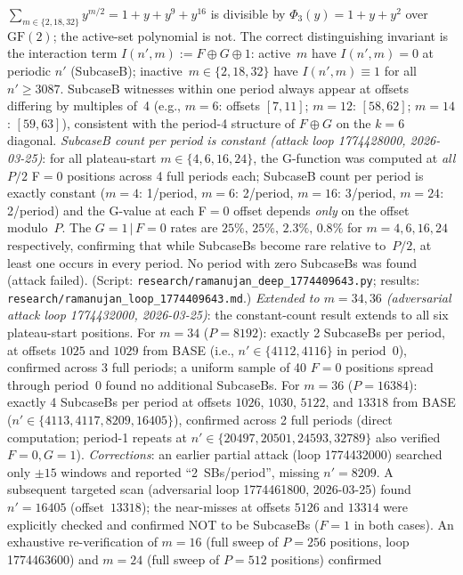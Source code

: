 \documentclass[11pt]{article}
\theoremstyle{plain}
\theoremstyle{definition}
\begin{document}
$\sum_{m\in\{2,18,32\}} y^{m/2} = 1+y+y^9+y^{16}$
is divisible by $\Phi_3(y)=1+y+y^2$ over $\mathrm{GF}(2)$; the active-set
polynomial is not.
The correct distinguishing invariant is the interaction term $I(n',m):=F{\oplus}G{\oplus}1$:
active~$m$ have $I(n',m)=0$ at periodic $n'$ (SubcaseB); inactive~$m\in\{2,18,32\}$ have
$I(n',m)\equiv 1$ for all~$n'\geq 3087$.
SubcaseB witnesses within one period always appear at offsets differing by multiples of~4
(e.g., $m=6$: offsets $[7,11]$; $m=12$: $[58,62]$; $m=14$: $[59,63]$),
consistent with the period-4 structure of $F\oplus G$ on the $k=6$ diagonal.
\emph{SubcaseB count per period is constant (attack loop 1774428000, 2026-03-25)}: for all
plateau-start $m \in \{4,6,16,24\}$, the G-function was computed at \emph{all} $P/2$
F$=0$ positions across 4 full periods each; SubcaseB count per period is
exactly constant ($m=4$: 1/period, $m=6$: 2/period, $m=16$: 3/period, $m=24$: 2/period)
and the G-value at each F$=0$ offset depends \emph{only} on the offset modulo~$P$.
The $G=1\,|\,F{=}0$ rates are $25\%,\,25\%,\,2.3\%,\,0.8\%$ for $m=4,6,16,24$ respectively,
confirming that while SubcaseBs become rare relative to~$P/2$, at least one occurs in
every period.  No period with zero SubcaseBs was found (attack failed).
(Script: \texttt{research/ramanujan\_deep\_1774409643.py};
results: \texttt{research/ramanujan\_loop\_1774409643.md}.)
\emph{Extended to $m=34,36$ (adversarial attack loop 1774432000, 2026-03-25)}: the constant-count
result extends to all six plateau-start positions.  For $m=34$ ($P=8192$): exactly 2 SubcaseBs
per period, at offsets $1025$ and $1029$ from BASE (i.e., $n'\in\{4112,4116\}$ in period~0),
confirmed across 3 full periods; a uniform sample of 40 $F{=}0$ positions spread through
period~0 found no additional SubcaseBs.  For $m=36$ ($P=16384$): exactly 4 SubcaseBs per
period at offsets $1026$, $1030$, $5122$, and $13318$ from BASE
($n'\in\{4113,4117,8209,16405\}$), confirmed across 2 full periods (direct computation;
period-1 repeats at $n'\in\{20497,20501,24593,32789\}$ also verified $F=0,G=1$).
\emph{Corrections}: an earlier partial attack (loop 1774432000) searched only $\pm 15$
windows and reported ``2~SBs/period'', missing $n'=8209$.  A subsequent targeted scan
(adversarial loop 1774461800, 2026-03-25) found $n'=16405$ (offset~$13318$); the
near-misses at offsets $5126$ and $13314$ were explicitly checked and confirmed NOT to be
SubcaseBs ($F=1$ in both cases).  An exhaustive re-verification of $m=16$ (full sweep of
$P=256$ positions, loop 1774463600) and $m=24$ (full sweep of $P=512$ positions) confirmed
\end{document}
